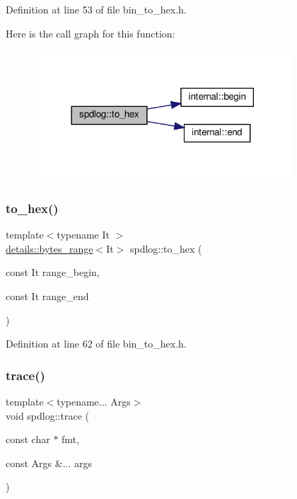 Definition at line 53 of file bin\+\_\+to\+\_\+hex.\+h.

Here is the call graph for this function\+:
\nopagebreak
\begin{figure}[H]
\begin{center}
\leavevmode
\includegraphics[width=273pt]{namespacespdlog_acd3f4323bb627945b4cecbbbc62770ef_cgraph}
\end{center}
\end{figure}
\mbox{\label{namespacespdlog_a3730108d5b1a43b30f8ddf32404b9d25}} 
\subsubsection{\texorpdfstring{to\+\_\+hex()}{to\_hex()}\hspace{0.1cm}{\footnotesize\ttfamily [2/2]}}
{\footnotesize\ttfamily template$<$typename It $>$ \\
\hyperlink{classspdlog_1_1details_1_1bytes__range}{details\+::bytes\+\_\+range}$<$It$>$ spdlog\+::to\+\_\+hex (\begin{DoxyParamCaption}\item[{const It}]{range\+\_\+begin,  }\item[{const It}]{range\+\_\+end }\end{DoxyParamCaption})\hspace{0.3cm}{\ttfamily [inline]}}



Definition at line 62 of file bin\+\_\+to\+\_\+hex.\+h.

\mbox{\label{namespacespdlog_a0ec6777ea7982bcf7cf85b87b0619b56}} 
\subsubsection{\texorpdfstring{trace()}{trace()}\hspace{0.1cm}{\footnotesize\ttfamily [1/2]}}
{\footnotesize\ttfamily template$<$typename... Args$>$ \\
void spdlog\+::trace (\begin{DoxyParamCaption}\item[{const char $\ast$}]{fmt,  }\item[{const Args \&...}]{args }\end{DoxyParamCaption})\hspace{0.3cm}{\ttfamily [inline]}}



